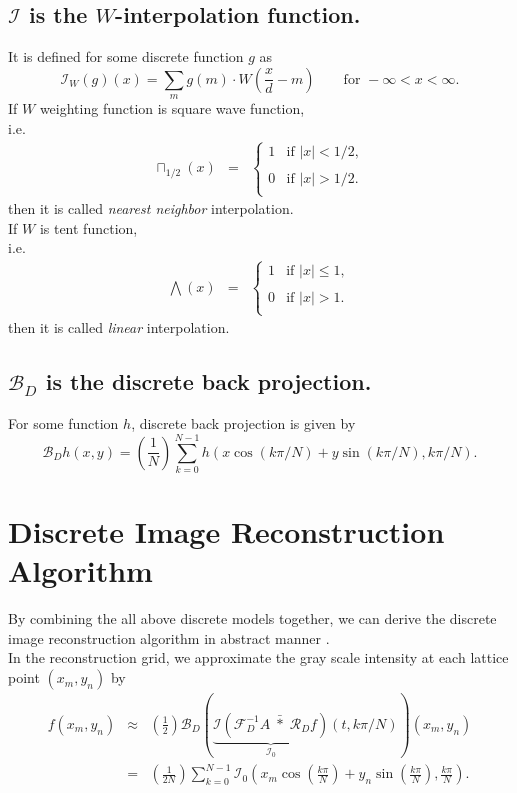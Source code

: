 \subsection{$\mathscr{I}$ is the $W$-interpolation function.}
It is defined for some discrete function $g$ as
$$
\mathscr{I}_W(g)(x) = \sum_m g(m) \cdot W\left( \frac{x}{d}-m \right) \qquad \text{for } -\infty < x < \infty. 
$$
If $W$ weighting function is square wave function,\\
i.e.
\begin{eqnarray}
\sqcap_{1/2}(x) &=& \left\{
\begin{array}{ll}
1 & \text{if } |x| < 1/2,\\
 & \\
0 & \text{if } |x| > 1/2 .\\
\end{array} \right. \nonumber
\end{eqnarray}
then it is called \textit{nearest neighbor} interpolation.\\
If $W$ is tent function,\\
i.e.
\begin{eqnarray}
\bigwedge(x) &=& \left\{
\begin{array}{ll}
1 & \text{if } |x| \leq 1,\\
 & \\
0 & \text{if } |x| > 1 .\\
\end{array} \right. \nonumber
\end{eqnarray}
then it is called \textit{linear} interpolation.  

\subsection{$\mathscr{B}_D$ is the discrete back projection.} 
For some function $h$, discrete back projection is given by
$$
\mathscr{B}_D h(x,y) = \left(\frac{1}{N}\right) \sum_{k=0}^{N-1} h(x \cos(k \pi/N)+ y \sin(k \pi/N), k \pi/N).
$$
\section{Discrete Image Reconstruction Algorithm}
By combining the all above discrete models together, we can derive the discrete image reconstruction algorithm in abstract manner \cite{TimothyBook}.\\
In the reconstruction grid, we approximate the gray scale intensity at each lattice point $(x_m, y_n)$ by
\begin{eqnarray}\label{algo}
f(x_m, y_n) &\approx & \left( \frac{1}{2}\right) \mathscr{B}_D \left( \underbrace{\mathscr{I} \left( \mathscr{F}^{-1}_{D} A \; \bar{*} \; \mathscr{R}_D f \right)}_{\mathscr{I}_0}(t,k\pi /N) \right) (x_m, y_n)  \\
&=& \left( \frac{1}{2N}\right) \sum_{k=0}^{N-1} \mathscr{I}_0  \left(x_m \cos \left(\frac{k \pi}{N}\right) + y_n \sin\left(\frac{k \pi}{N}\right), \frac{k \pi}{N}\right).\nonumber
\end{eqnarray}